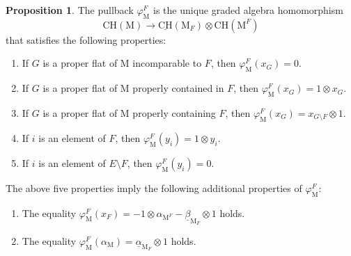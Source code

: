 \documentclass[11pt,reqno]{amsart}
\theoremstyle{definition}
\newtheorem{proposition}[theorem]{Proposition}
\theoremstyle{remark}
\renewcommand{\(}{\left(}
\renewcommand{\)}{\right)}
\newcommand{\<}{\left<}
\renewcommand{\>}{\right>}
\begin{document}
\begin{proposition}\label{DefinitionXPullback}
The pullback 
$
\varphi^F_\mathrm{M}%
$
is the unique graded algebra homomorphism 
\[
\mathrm{CH}(\mathrm{M}) \longrightarrow  \underline{\mathrm{CH}}(\mathrm{M}_F) \otimes \mathrm{CH}(\mathrm{M}^F) 
\]
 that satisfies the following properties:
\begin{enumerate}[$\bullet$]\itemsep 5pt
\item If $G$ is a proper flat of $\mathrm{M}$ incomparable to $F$, then $\varphi^F_\mathrm{M}(x_G)=0$.
\item If $G$ is a proper flat of $\mathrm{M}$ properly contained in $F$, then $\varphi^F_\mathrm{M}(x_G)=1 \otimes x_G$.
\item If $G$ is a proper flat of $\mathrm{M}$  properly containing $F$, then $\varphi^F_\mathrm{M}(x_G)=x_{G \setminus F} \otimes 1$.
\item If $i$ is an element of $F$, then $\varphi^F_\mathrm{M}(y_i)=1 \otimes y_i$.
\item If $i$ is an element of $E \setminus F$, then $\varphi^F_\mathrm{M}(y_i)=0$.
 \end{enumerate}
 The above five properties imply the following additional properties of $\varphi^F_\mathrm{M}$:
 \begin{enumerate}[$\bullet$]\itemsep 5pt
\item The equality $\varphi^F_\mathrm{M}(x_F)=-1\otimes\alpha_{\mathrm{M}^F}-\underline{\beta}_{\mathrm{M}_F} \otimes 1$ holds.
\item The equality $\varphi^F_\mathrm{M}(\alpha_\mathrm{M})=\underline{\alpha}_{\mathrm{M}_F} \otimes 1$ holds.
\end{enumerate}
\end{proposition}
\end{document}

